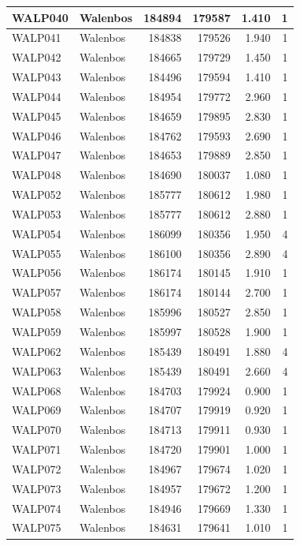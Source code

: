 \documentclass[11pt,]{book}
\begin{document}
\begin{table}
\begin{tabular}[t]{l|l|r|r|r|r}
\hline
WALP040 & Walenbos & 184894 & 179587 & 1.410 & 1\\
\hline
WALP041 & Walenbos & 184838 & 179526 & 1.940 & 1\\
\hline
WALP042 & Walenbos & 184665 & 179729 & 1.450 & 1\\
\hline
WALP043 & Walenbos & 184496 & 179594 & 1.410 & 1\\
\hline
WALP044 & Walenbos & 184954 & 179772 & 2.960 & 1\\
\hline
WALP045 & Walenbos & 184659 & 179895 & 2.830 & 1\\
\hline
WALP046 & Walenbos & 184762 & 179593 & 2.690 & 1\\
\hline
WALP047 & Walenbos & 184653 & 179889 & 2.850 & 1\\
\hline
WALP048 & Walenbos & 184690 & 180037 & 1.080 & 1\\
\hline
WALP052 & Walenbos & 185777 & 180612 & 1.980 & 1\\
\hline
WALP053 & Walenbos & 185777 & 180612 & 2.880 & 1\\
\hline
WALP054 & Walenbos & 186099 & 180356 & 1.950 & 4\\
\hline
WALP055 & Walenbos & 186100 & 180356 & 2.890 & 4\\
\hline
WALP056 & Walenbos & 186174 & 180145 & 1.910 & 1\\
\hline
WALP057 & Walenbos & 186174 & 180144 & 2.700 & 1\\
\hline
WALP058 & Walenbos & 185996 & 180527 & 2.850 & 1\\
\hline
WALP059 & Walenbos & 185997 & 180528 & 1.900 & 1\\
\hline
WALP062 & Walenbos & 185439 & 180491 & 1.880 & 4\\
\hline
WALP063 & Walenbos & 185439 & 180491 & 2.660 & 4\\
\hline
WALP068 & Walenbos & 184703 & 179924 & 0.900 & 1\\
\hline
WALP069 & Walenbos & 184707 & 179919 & 0.920 & 1\\
\hline
WALP070 & Walenbos & 184713 & 179911 & 0.930 & 1\\
\hline
WALP071 & Walenbos & 184720 & 179901 & 1.000 & 1\\
\hline
WALP072 & Walenbos & 184967 & 179674 & 1.020 & 1\\
\hline
WALP073 & Walenbos & 184957 & 179672 & 1.200 & 1\\
\hline
WALP074 & Walenbos & 184946 & 179669 & 1.330 & 1\\
\hline
WALP075 & Walenbos & 184631 & 179641 & 1.010 & 1\\

\end{tabular}
\end{table}
\end{document}
